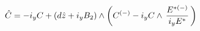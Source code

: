 \begin{equation}\label{rhC=}
\hat{C} = - i_y C + (d\hat{z}+ i_yB_2)\wedge 
\left(C^{(-)}- i_y C \wedge \,
 {{E}^{ {*}(-)}\over i_{y}{E}^{ {*}}}\, \right)
\, 
\end{equation}

